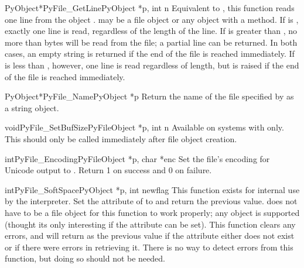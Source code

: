 \begin{cfuncdesc}{PyObject*}{PyFile_GetLine}{PyObject *p, int n}
  Equivalent to , this
  function reads one line from the object .   may be a
  file object or any object with a  method.  If
   is , exactly one line is read, regardless of the
  length of the line.  If  is greater than , no more
  than  bytes will be read from the file; a partial line can be
  returned.  In both cases, an empty string is returned if the end of
  the file is reached immediately.  If  is less than ,
  however, one line is read regardless of length, but
   is raised if the end of the file is reached
  immediately.
\end{cfuncdesc}

\begin{cfuncdesc}{PyObject*}{PyFile_Name}{PyObject *p}
  Return the name of the file specified by  as a string
  object.
\end{cfuncdesc}

\begin{cfuncdesc}{void}{PyFile_SetBufSize}{PyFileObject *p, int n}
  Available on systems with 
  only.  This should only be called immediately after file object
  creation.
\end{cfuncdesc}

\begin{cfuncdesc}{int}{PyFile_Encoding}{PyFileObject *p, char *enc}
  Set the file's encoding for Unicode output to . Return
  1 on success and 0 on failure.
\end{cfuncdesc}

\begin{cfuncdesc}{int}{PyFile_SoftSpace}{PyObject *p, int newflag}
  This function exists for internal use by the interpreter.  Set the
   attribute of  to  and
  return the
  previous value.   does not have to be a file object for this
  function to work properly; any object is supported (thought its only
  interesting if the  attribute can be set).  This
  function clears any errors, and will return  as the previous
  value if the attribute either does not exist or if there were errors
  in retrieving it.  There is no way to detect errors from this
  function, but doing so should not be needed.
\end{cfuncdesc}

